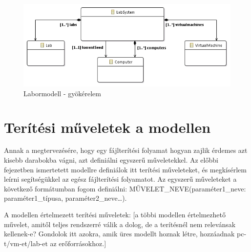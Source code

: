 \begin{figure}[h!]
	\centering
	\includegraphics[width=130mm, keepaspectratio]{figures/design_modelroot.png}
	\caption{Labormodell - gyökérelem}
	\label{fig:designmodelroot}
\end{figure}

\section{Terítési műveletek a modellen}
\label{distrops}

Annak a megtervezésére, hogy egy fájlterítési folyamat hogyan zajlik érdemes azt kisebb darabokba vágni, azt definiálni egyszerű műveletekkel.
Az előbbi fejezetben ismertetett modellre definiálok itt terítési műveleteket, és megkísérlem leírni segítségükkel az egész fájlterítési folyamatot.
Az egyszerű műveleteket a következő formátumban fogom definiálni: MŰVELET\_NEVE(paraméter1\_neve: paraméter1\_típusa, paraméter2\_neve\ldots).

A modellen értelmezett terítési műveletek: [a többi modellen értelmezhető művelet, amitől teljes rendszerré válik a dolog, de a terítésnél nem relevánsak kellenek-e? Gondolok itt azokra, amik üres modellt hoznak létre, hozzáadnak pc-t/vm-et/lab-et az erőforrásokhoz.]%

